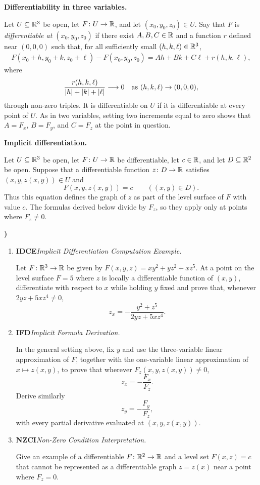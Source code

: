 \documentclass[10pt,a4paper]{article}
\newcounter{examquestion}
\newcommand{\examquestion}[1]{%
  \Needspace{5\baselineskip}%
  \refstepcounter{examquestion}%
  \par\addvspace{0.8\baselineskip}%
  \noindent\textbf{\theexamquestion)}\enspace #1\par
}
\newenvironment{subquestions}
  {\begin{enumerate}[label=\alph*),leftmargin=2.1em]}
  {\end{enumerate}}
\newcommand{\nameditem}[2]{%
  \textbf{\textsf{#1}}\enspace\emph{#2.}\enspace
}
\newcommand{\concept}[1]{%
  \par\addvspace{0.55\baselineskip}\noindent\textbf{#1.}\enspace
}
\begin{document}
\concept{Differentiability in three variables}
Let $U\subseteq\mathbb{R}^3$ be open, let $F\colon U\to\mathbb{R}$, and let
$(x_0,y_0,z_0)\in U$.  Say that $F$ is \emph{differentiable at
$(x_0,y_0,z_0)$} if there exist $A,B,C\in\mathbb{R}$ and a function $r$ defined
near $(0,0,0)$ such that, for all sufficiently small
$(h,k,\ell)\in\mathbb{R}^3$,
\[
\begin{aligned}
 F(x_0+h,y_0+k,z_0+\ell)-F(x_0,y_0,z_0)
   =Ah+Bk+C\ell+r(h,k,\ell),
\end{aligned}
\]
where
\[
  \frac{r(h,k,\ell)}{|h|+|k|+|\ell|}\longrightarrow0
  \quad\hbox{as }(h,k,\ell)\to(0,0,0),
\]
through non-zero triples.  It is differentiable on $U$ if it is
differentiable at every point of $U$.  As in two variables, setting two
increments equal to zero shows that $A=F_x$, $B=F_y$, and $C=F_z$ at the
point in question.

\concept{Implicit differentiation}
Let $U\subseteq\mathbb{R}^3$ be open, let $F\colon U\to\mathbb{R}$ be differentiable,
let $c\in\mathbb{R}$, and let $D\subseteq\mathbb{R}^2$ be open.  Suppose that a
differentiable function $z\colon D\to\mathbb{R}$ satisfies
$(x,y,z(x,y))\in U$ and
\[
  F(x,y,z(x,y))=c\qquad((x,y)\in D).
\]
Thus this equation defines the graph of $z$ as part of the level surface of
$F$ with value $c$.  The formulas derived below divide by $F_z$, so they
apply only at points where $F_z\ne0$.

\examquestion{\label{q:implicit-differentiation}
\begin{subquestions}
  \item \nameditem{IDCE}{Implicit Differentiation Computation Example}
  Let $F\colon\mathbb{R}^3\to\mathbb{R}$ be given by
  $F(x,y,z)=xy^2+yz^2+xz^5$.  At a point on the level surface $F=5$
  where $z$ is locally a differentiable function of $(x,y)$, differentiate
  with respect to $x$ while holding $y$ fixed and prove that, whenever
  $2yz+5xz^4\ne0$,
  \[
    z_x=-\frac{y^2+z^5}{2yz+5xz^4}.
  \]

  \item \nameditem{IFD}{Implicit Formula Derivation}
  In the general setting above, fix $y$ and use the three-variable linear
  approximation of $F$, together with the one-variable linear approximation
  of $x\mapsto z(x,y)$, to prove that wherever
  $F_z(x,y,z(x,y))\ne0$,
  \[
    z_x=-\frac{F_x}{F_z}.
  \]
  Derive similarly
  \[
    z_y=-\frac{F_y}{F_z},
  \]
  with every partial derivative evaluated at $(x,y,z(x,y))$.

  \item \nameditem{NZCI}{Non-Zero Condition Interpretation}
  Give an example of a differentiable $F\colon\mathbb{R}^2\to\mathbb{R}$ and a level set
  $F(x,z)=c$ that cannot be represented as a differentiable graph
  $z=z(x)$ near a point where $F_z=0$.
\end{subquestions}}
\end{document}
